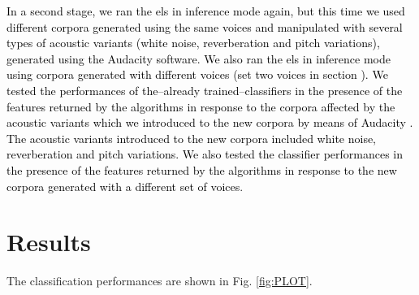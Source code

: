 \documentclass[10pt,letterpaper]{article}
\newcommand{\reviewertwo}[1]{\textcolor{black}{#1}}
\newcommand{\reviewerfour}[1]{\textcolor{black}{#1}}
\begin{document}
\pagebreak

\reviewerfour{In a second stage, we ran the \glspl{el} in inference mode again, but \reviewertwo{this time we used different corpora generated using the same voices and manipulated with several types of acoustic variants (white noise, reverberation and pitch variations), generated using the Audacity software}. We also ran the \glspl{el} in inference mode using corpora generated with different voices (set two voices in section \nameref{CorpGen}). We tested the performances of the--already trained--classifiers in the presence of the features returned by the algorithms in response to the corpora affected by the \reviewertwo{acoustic variants} which we introduced to the new corpora by means of Audacity \cite{audacity}. The \reviewertwo{acoustic variants} introduced to the new corpora included white noise, reverberation and pitch variations. We also tested the classifier performances in the presence of the features returned by the algorithms in response to the new corpora generated with a different set of voices}.











\section*{Results}

The classification performances are shown in Fig. \ref{fig:PLOT}.
\end{document}
